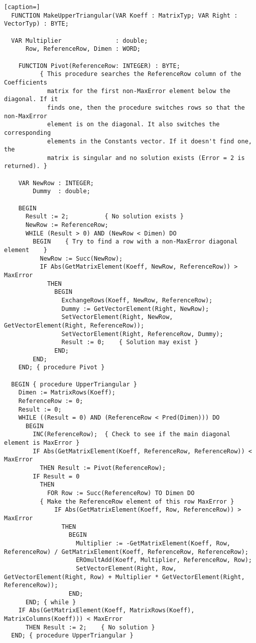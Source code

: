 \begin{lstlisting}[caption=]
  FUNCTION MakeUpperTriangular(VAR Koeff : MatrixTyp; VAR Right : VectorTyp) : BYTE;

  VAR Multiplier               : double;
      Row, ReferenceRow, Dimen : WORD;

    FUNCTION Pivot(ReferenceRow: INTEGER) : BYTE;
          { This procedure searches the ReferenceRow column of the Coefficients
            matrix for the first non-MaxError element below the diagonal. If it
            finds one, then the procedure switches rows so that the non-MaxError
            element is on the diagonal. It also switches the corresponding
            elements in the Constants vector. If it doesn't find one, the
            matrix is singular and no solution exists (Error = 2 is returned). }

    VAR NewRow : INTEGER;
        Dummy  : double;

    BEGIN
      Result := 2;          { No solution exists }
      NewRow := ReferenceRow;
      WHILE (Result > 0) AND (NewRow < Dimen) DO
        BEGIN    { Try to find a row with a non-MaxError diagonal element    }
          NewRow := Succ(NewRow);
          IF Abs(GetMatrixElement(Koeff, NewRow, ReferenceRow)) > MaxError
            THEN
              BEGIN
                ExchangeRows(Koeff, NewRow, ReferenceRow);
                Dummy := GetVectorElement(Right, NewRow);
                SetVectorElement(Right, NewRow, GetVectorElement(Right, ReferenceRow));
                SetVectorElement(Right, ReferenceRow, Dummy);
                Result := 0;    { Solution may exist }
              END;
        END;
    END; { procedure Pivot }

  BEGIN { procedure UpperTriangular }
    Dimen := MatrixRows(Koeff);
    ReferenceRow := 0;
    Result := 0;
    WHILE ((Result = 0) AND (ReferenceRow < Pred(Dimen))) DO
      BEGIN
        INC(ReferenceRow);  { Check to see if the main diagonal element is MaxError }
        IF Abs(GetMatrixElement(Koeff, ReferenceRow, ReferenceRow)) < MaxError
          THEN Result := Pivot(ReferenceRow);
        IF Result = 0
          THEN
            FOR Row := Succ(ReferenceRow) TO Dimen DO
          { Make the ReferenceRow element of this row MaxError }
              IF Abs(GetMatrixElement(Koeff, Row, ReferenceRow)) > MaxError
                THEN
                  BEGIN
                    Multiplier := -GetMatrixElement(Koeff, Row, ReferenceRow) / GetMatrixElement(Koeff, ReferenceRow, ReferenceRow);
                    EROmultAdd(Koeff, Multiplier, ReferenceRow, Row);
                    SetVectorElement(Right, Row, GetVectorElement(Right, Row) + Multiplier * GetVectorElement(Right, ReferenceRow));
                  END;
      END; { while }
    IF Abs(GetMatrixElement(Koeff, MatrixRows(Koeff), MatrixColumns(Koeff))) < MaxError
      THEN Result := 2;    { No solution }
  END; { procedure UpperTriangular }
\end{lstlisting}

